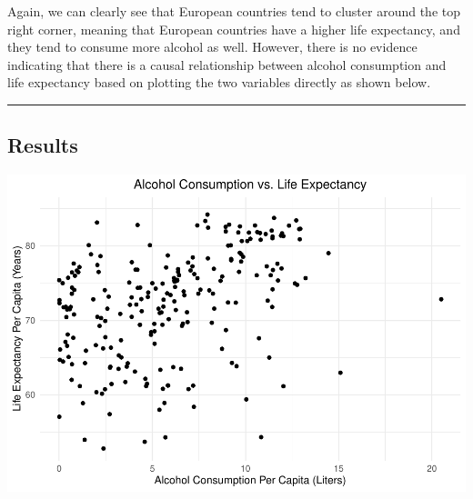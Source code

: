 \documentclass[
]{article}
\newenvironment{Shaded}{\begin{snugshade}}{\end{snugshade}}
\newcommand{\DataTypeTok}[1]{\textcolor[rgb]{0.00,0.34,0.68}{#1}}
\newcommand{\FloatTok}[1]{\textcolor[rgb]{0.69,0.50,0.00}{#1}}
\newcommand{\KeywordTok}[1]{\textcolor[rgb]{0.12,0.11,0.11}{\textbf{#1}}}
\newcommand{\NormalTok}[1]{\textcolor[rgb]{0.12,0.11,0.11}{#1}}
\newcommand{\OperatorTok}[1]{\textcolor[rgb]{0.12,0.11,0.11}{#1}}
\newcommand{\StringTok}[1]{\textcolor[rgb]{0.75,0.01,0.01}{#1}}
\begin{document}
Again, we can clearly see that European countries tend to cluster around
the top right corner, meaning that European countries have a higher life
expectancy, and they tend to consume more alcohol as well. However,
there is no evidence indicating that there is a causal relationship
between alcohol consumption and life expectancy based on plotting the
two variables directly as shown below.

\begin{center}\rule{0.5\linewidth}{0.5pt}\end{center}

\hypertarget{results}{%
\subsection{Results}\label{results}}

\begin{Shaded}
\end{Shaded}

\includegraphics{final_report_files/figure-latex/unnamed-chunk-14-1.pdf}
\end{document}
